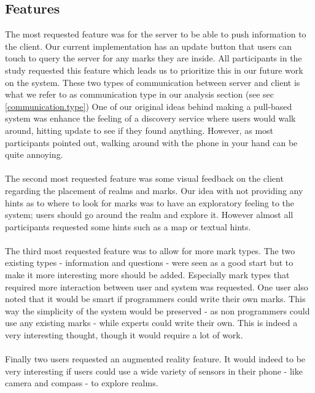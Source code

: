 \subsection{Features} %
\label{sub:features}
The most requested feature was for the server to be able to push information to the client. Our current implementation has an update button that users can touch to query the server for any marks they are inside. All participants in the study requested this feature which leads us to prioritize this in our future work on the system. These two types of communication between server and client is what we refer to as communication type in our analysis section (see sec \ref{communication.type}) One of our original ideas behind making a pull-based system was enhance the feeling of a discovery service where users would walk around, hitting update to see if they found anything. However, as most participants pointed out, walking around with the phone in your hand can be quite annoying.
\\\\
The second most requested feature was some visual feedback on the client regarding the placement of realms and marks. Our idea with not providing any hints as to where to look for marks was to have an exploratory feeling to the system; users should go around the realm and explore it. However almost all participants requested some hints such as a map or textual hints.  
\\\\
The third most requested feature was to allow for more mark types. The two existing types - information and questions - were seen as a good start but to make it more interesting more should be added. Especially mark types that required more interaction between user and system was requested. One user also noted that it would be smart if programmers could write their own marks. This way the simplicity of the system would be preserved - as non programmers could use any existing marks - while experts could write their own. This is indeed a very interesting thought, though it would require a lot of work.
\\\\
Finally two users requested an augmented reality feature. It would indeed to be very interesting if users could use a wide variety of sensors in their phone - like camera and compass - to explore realms.


